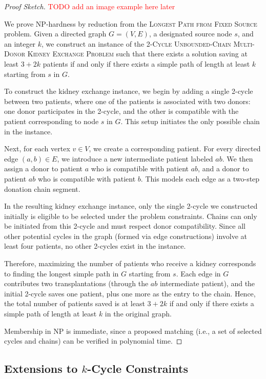 \begin{proof}[Proof Sketch]
\textcolor{red}{TODO add an image example here later}

We prove NP-hardness by reduction from the \textsc{Longest Path from Fixed Source} problem. Given a directed graph $G = (V, E)$, a designated source node $s$, and an integer $k$, we construct an instance of the \textsc{2-Cycle Unbounded-Chain Multi-Donor Kidney Exchange Problem} such that there exists a solution saving at least $3 + 2k$ patients if and only if there exists a simple path of length at least $k$ starting from $s$ in $G$.

To construct the kidney exchange instance, we begin by adding a single 2-cycle between two patients, where one of the patients is associated with two donors: one donor participates in the 2-cycle, and the other is compatible with the patient corresponding to node $s$ in $G$. This setup initiates the only possible chain in the instance.

Next, for each vertex $v \in V$, we create a corresponding patient. For every directed edge $(a, b) \in E$, we introduce a new intermediate patient labeled $ab$. We then assign a donor to patient $a$ who is compatible with patient $ab$, and a donor to patient $ab$ who is compatible with patient $b$. This models each edge as a two-step donation chain segment.

In the resulting kidney exchange instance, only the single 2-cycle we constructed initially is eligible to be selected under the problem constraints. Chains can only be initiated from this 2-cycle and must respect donor compatibility. Since all other potential cycles in the graph (formed via edge constructions) involve at least four patients, no other 2-cycles exist in the instance.

Therefore, maximizing the number of patients who receive a kidney corresponds to finding the longest simple path in $G$ starting from $s$. Each edge in $G$ contributes two transplantations (through the $ab$ intermediate patient), and the initial 2-cycle saves one patient, plus one more as the entry to the chain. Hence, the total number of patients saved is at least $3 + 2k$ if and only if there exists a simple path of length at least $k$ in the original graph.

Membership in NP is immediate, since a proposed matching (i.e., a set of selected cycles and chains) can be verified in polynomial time.
\end{proof}

\subsection{Extensions to \texorpdfstring{$k$}{k}-Cycle Constraints}

